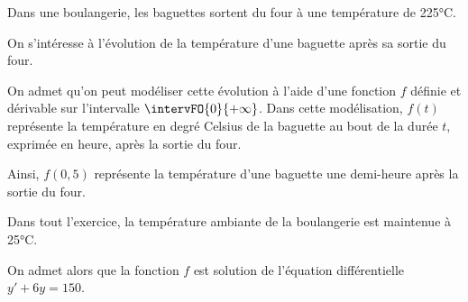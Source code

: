 Dans une boulangerie, les baguettes sortent du four à une température de 225°C.

On s’intéresse à l’évolution de la température d’une baguette après sa sortie du four.

On admet qu’on peut modéliser cette évolution à l’aide d’une fonction $f$ définie et dérivable sur l’intervalle $\intervFO{0}{+\infty}$. Dans cette modélisation, $f(t)$ représente la température en degré Celsius de la baguette au bout de la durée $t$, exprimée en heure, après la sortie du four.

Ainsi, $f(0,5)$ représente la température d’une baguette une demi-heure après la sortie du four.

Dans tout l’exercice, la température ambiante de la boulangerie est maintenue à 25°C.

On admet alors que la fonction $f$ est solution de l'équation différentielle $y'+6y = 150$.

